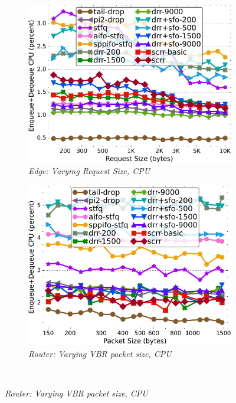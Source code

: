 \begin{figure}[th!]
  \begin{subfigure}[t]{.30\linewidth}
    \centering
    \includegraphics[width=0.95\linewidth]{figs/pkt_size_edge_cn_2t1x32_mn_2tb1x8_bbr3_kp_comp_methods.pdf}
    \caption{\small{\textit{Edge: Varying Request Size, CPU}}}
    \label{fig:request-edge-bbr3-cpu-full}
  \end{subfigure}
  \begin{subfigure}[t]{.30\linewidth}
    \centering
    \includegraphics[width=0.95\linewidth]{figs/pkt_size_cn_2t4x16_mn_2ui32_bbr3_kp_comp_methods.pdf}
    \caption{\small{\textit{Router: Varying VBR packet size, CPU}}}
    \label{fig:vbr-bbr3-cpu-full}
  \end{subfigure}
  \\

\end{figure}
